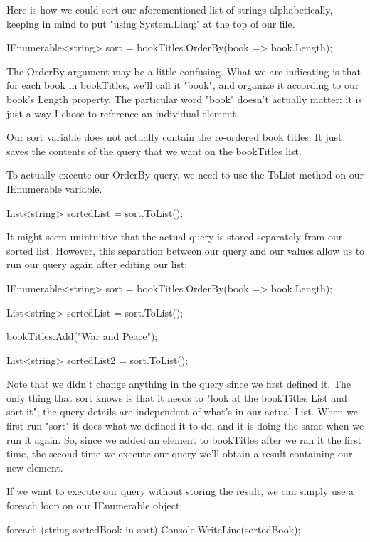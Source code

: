 \documentclass[oneside, openany] {book}
\begin{document}
Here is how we could sort our aforementioned list of strings alphabetically, keeping in mind to put "using System.Linq;" at the top of our file.
\begin{CSharp}
IEnumerable<string> sort = bookTitles.OrderBy(book => book.Length);
\end{CSharp}
The OrderBy argument may be a little confusing. What we are indicating is that for each book in bookTitles, we'll call it "book", and organize it according to our book's Length property. The particular word "book" doesn't actually matter: it is just a way I chose to reference an individual element.

Our sort variable does not actually contain the re-ordered book titles. It just saves the contents of the query that we want on the bookTitles list.

To actually execute our OrderBy query, we need to use the ToList method on our IEnumerable variable.
\begin{CSharp}
List<string> sortedList = sort.ToList();
\end{CSharp}

It might seem unintuitive that the actual query is stored separately from our sorted list. However, this separation between our query and our values allow us to run our query again after editing our list:

\begin{CSharp}
IEnumerable<string> sort = bookTitles.OrderBy(book => book.Length);

List<string> sortedList = sort.ToList();

bookTitles.Add("War and Peace");

List<string> sortedList2 = sort.ToList();
\end{CSharp}


Note that we didn't change anything in the query since we first defined it. The only thing that sort knows is that it needs to "look at the bookTitles List and sort it"; the query details are independent of what's in our actual List. When we first run "sort" it does what we defined it to do, and it is doing the same when we run it again. So, since we added an element to bookTitles after we ran it the first time, the second time we execute our query we'll obtain a result containing our new element.

If we want to execute our query without storing the result, we can simply use a foreach loop on our IEnumerable object:
\begin{CSharp}
foreach (string sortedBook in sort)
{
    Console.WriteLine(sortedBook);
}
\end{CSharp}
\end{document}
